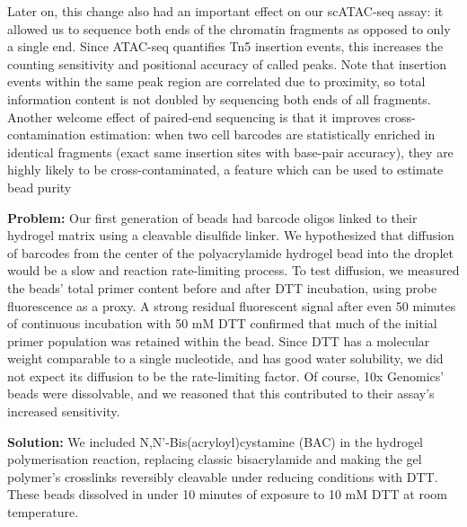 
Later on, this change also had an important effect on our scATAC-seq assay: it allowed us to sequence both ends of the chromatin fragments as opposed to only a single end. Since ATAC-seq quantifies Tn5 insertion events, this increases the counting sensitivity and positional accuracy of called peaks. Note that insertion events within the same peak region are correlated due to proximity, so total information content is not doubled by sequencing both ends of all fragments. Another welcome effect of paired-end sequencing is that it improves cross-contamination estimation: when two cell barcodes are statistically enriched in identical fragments (exact same insertion sites with base-pair accuracy), they are highly likely to be cross-contaminated, a feature which can be used to estimate bead purity


\textbf{Problem:} Our first generation of beads had barcode oligos linked to their hydrogel matrix using a cleavable disulfide linker. We hypothesized that diffusion of barcodes from the center of the polyacrylamide hydrogel bead into the droplet would be a slow and reaction rate-limiting process. To test diffusion, we measured the beads' total primer content before and after DTT incubation, using probe fluorescence as a proxy. A strong residual fluorescent signal after even 50 minutes of continuous incubation with 50 mM DTT confirmed that much of the initial primer population was retained within the bead. Since DTT has a molecular weight comparable to a single nucleotide, and has good water solubility, we did not expect its diffusion to be the rate-limiting factor. Of course, 10x Genomics' beads were dissolvable, and we reasoned that this contributed to their assay's increased sensitivity.

\textbf{Solution:} We included N,N'-Bis(acryloyl)cystamine (BAC) in the hydrogel polymerisation reaction, replacing classic bisacrylamide and making the gel polymer's crosslinks reversibly cleavable under reducing conditions with DTT. These beads dissolved in under 10 minutes of exposure to 10 mM DTT at room temperature.

